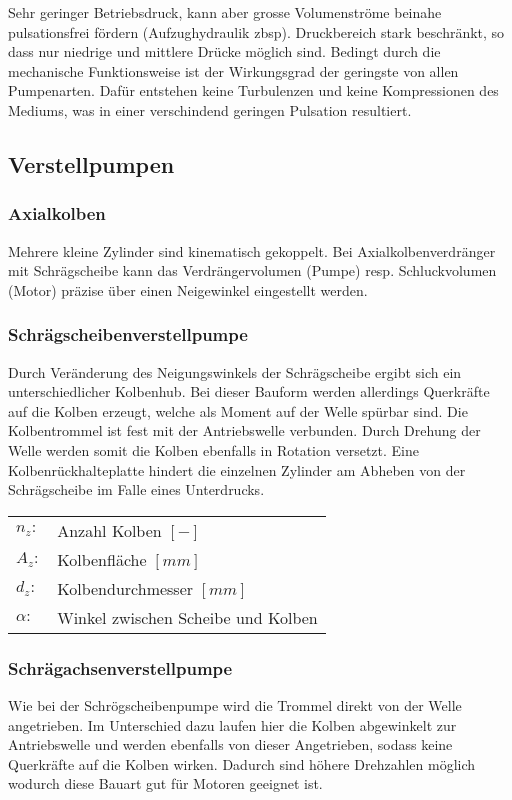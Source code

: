 Sehr geringer Betriebsdruck, kann aber grosse Volumenströme beinahe pulsationsfrei fördern (Aufzughydraulik zbsp). 
Druckbereich stark beschränkt, so dass nur niedrige und mittlere Drücke möglich sind. Bedingt durch die mechanische Funktionsweise ist der Wirkungsgrad der geringste von allen Pumpenarten. Dafür entstehen keine Turbulenzen und keine Kompressionen des Mediums, was in einer verschindend geringen Pulsation resultiert. 



\subsection{Verstellpumpen}

\subsubsection{Axialkolben}
Mehrere kleine Zylinder sind kinematisch gekoppelt. Bei Axialkolbenverdränger mit Schrägscheibe kann das Verdrängervolumen (Pumpe) resp. Schluckvolumen (Motor) präzise über einen Neigewinkel eingestellt werden.

\subsubsection{Schrägscheibenverstellpumpe}
Durch Veränderung des Neigungswinkels der Schrägscheibe ergibt sich ein unterschiedlicher Kolbenhub. Bei dieser Bauform werden allerdings Querkräfte auf die Kolben erzeugt, welche als Moment auf der Welle spürbar sind. Die Kolbentrommel ist fest mit der Antriebswelle verbunden. Durch Drehung der Welle werden somit die Kolben ebenfalls in Rotation versetzt. Eine Kolbenrückhalteplatte hindert die einzelnen Zylinder am Abheben von der Schrägscheibe im Falle eines Unterdrucks. 

\begin{tabular}{ll}
$n_z:$ & Anzahl Kolben $[-]$ \\
$A_z:$ & Kolbenfläche $[mm]$ \\
$d_z:$ & Kolbendurchmesser $[mm]$ \\
$\alpha: $ & Winkel zwischen Scheibe und Kolben
\end{tabular}


\subsubsection{Schrägachsenverstellpumpe}
Wie bei der Schrögscheibenpumpe wird die Trommel direkt von der Welle angetrieben. Im Unterschied dazu laufen hier die Kolben abgewinkelt zur Antriebswelle und werden ebenfalls von dieser Angetrieben, sodass keine Querkräfte auf die Kolben wirken. Dadurch sind höhere Drehzahlen möglich wodurch diese Bauart gut für Motoren geeignet ist. 


